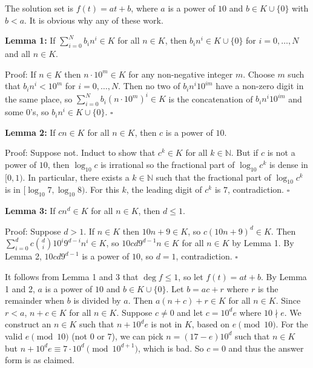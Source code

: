 The solution set is $f(t)=at+b$, where $a$ is a power of $10$ and $b\in K\cup\{0\}$ with $b<a$. It is obvious why any of these work.

\textbf{Lemma 1:} If $\displaystyle\sum_{i=0}^Nb_in^i\in K$ for all $n\in K$, then $b_in^i\in K\cup\{0\}$ for $i=0,\ldots,N$ and all $n\in K$.

Proof: If $n\in K$ then $n\cdot10^m\in K$ for any non-negative integer $m$. Choose $m$ such that $b_in^i<10^m$ for $i=0,\ldots,N$. Then no two of $b_in^i10^{im}$ have a non-zero digit in the same place, so $\displaystyle\sum_{i=0}^Nb_i(n\cdot10^m)^i\in K$ is the concatenation of $b_in^i10^{im}$ and some $0$'s, so $b_in^i\in K\cup\{0\}$. $\square$

\textbf{Lemma 2:} If $cn\in K$ for all $n\in K$, then $c$ is a power of $10$.

Proof: Suppose not. Induct to show that $c^k\in K$ for all $k\in\mathbb{N}$. But if $c$ is not a power of $10$, then $\log_{10}c$ is irrational so the fractional part of $\log_{10}c^k$ is dense in $[0,1)$. In particular, there exists a $k\in\mathbb{N}$ such that the fractional part of $\log_{10}c^k$ is in $[\log_{10}7,\log_{10}8)$. For this $k$, the leading digit of $c^k$ is $7$, contradiction. $\square$

\textbf{Lemma 3:} If $cn^d\in K$ for all $n\in K$, then $d\leq1$.

Proof: Suppose $d>1$. If $n\in K$ then $10n+9\in K$, so $c(10n+9)^d\in K$. Then $\displaystyle\sum_{i=0}^dc\binom{d}{i}10^i9^{d-i}n^i\in K$, so $10cd9^{d-1}n\in K$ for all $n\in K$ by Lemma 1. By Lemma 2, $10cd9^{d-1}$ is a power of $10$, so $d=1$, contradiction. $\square$

It follows from Lemma 1 and 3 that $\deg f\leq1$, so let $f(t)=at+b$. By Lemma 1 and 2, $a$ is a power of $10$ and $b\in K\cup\{0\}$. Let $b=ac+r$ where $r$ is the remainder when $b$ is divided by $a$. Then $a(n+c)+r\in K$ for all $n\in K$. Since $r<a$, $n+c\in K$ for all $n\in K$. Suppose $c\neq0$ and let $c=10^de$ where $10\nmid e$. We construct an $n\in K$ such that $n+10^de$ is not in $K$, based on $e\pmod{10}$. For the valid $e\pmod{10}$ (not $0$ or $7$), we can pick $n=(17-e)10^d$ such that $n\in K$ but $n+10^de\equiv7\cdot10^d\pmod{10^{d+1}}$, which is bad. So $c=0$ and thus the answer form is as claimed.